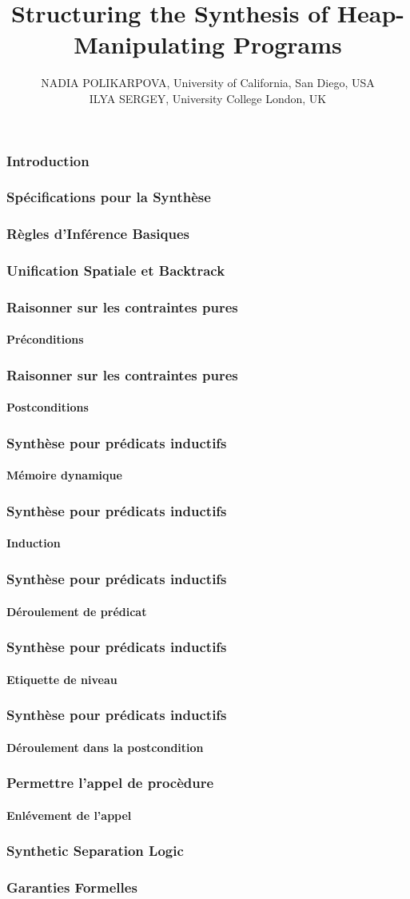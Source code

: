 \documentclass{beamer}
\title{Structuring the Synthesis of Heap-Manipulating Programs}
\author{NADIA POLIKARPOVA, University of California, San Diego, USA \\
ILYA SERGEY, University College London, UK}
\date{}
\begin{document}
	\maketitle
\begin{frame}[fragile]
	\frametitle{Introduction}
\end{frame}
\begin{frame}[fragile]
	\frametitle{Sp\'ecifications pour la Synth\`ese}
\end{frame}
\begin{frame}[fragile]
	\frametitle{R\`egles d'Inf\'erence Basiques}
\end{frame}
\begin{frame}[fragile]
	\frametitle{Unification Spatiale et Backtrack}
\end{frame}
\begin{frame}[fragile]
	\frametitle{Raisonner sur les contraintes pures}
	\framesubtitle{Pr\'econditions}
\end{frame}
\begin{frame}[fragile]
	\frametitle{Raisonner sur les contraintes pures}
	\framesubtitle{Postconditions}
\end{frame}
\begin{frame}[fragile]
	\frametitle{Synth\`ese pour pr\'edicats inductifs}
	\framesubtitle{M\'emoire dynamique}
\end{frame}
\begin{frame}[fragile]
	\frametitle{Synth\`ese pour pr\'edicats inductifs}
	\framesubtitle{Induction}
\end{frame}
\begin{frame}[fragile]
	\frametitle{Synth\`ese pour pr\'edicats inductifs}
	\framesubtitle{D\'eroulement de pr\'edicat}
\end{frame}
\begin{frame}[fragile]
	\frametitle{Synth\`ese pour pr\'edicats inductifs}
	\framesubtitle{Etiquette de niveau}
\end{frame}
\begin{frame}[fragile]
	\frametitle{Synth\`ese pour pr\'edicats inductifs}
	\framesubtitle{D\'eroulement dans la postcondition}
\end{frame}
\begin{frame}[fragile]
	\frametitle{Permettre l'appel de proc\`edure}
	\framesubtitle{Enl\'evement de l'appel}
\end{frame}
\begin{frame}[fragile]
	\frametitle{Synthetic Separation Logic}
\end{frame}
\begin{frame}[fragile]
	\frametitle{Garanties Formelles}
\end{frame}
\end{document}
